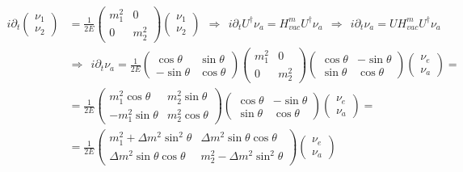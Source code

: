 \documentclass[a4paper,12pt]{article}
\begin{document}
\begin{align*}
i\partial_t\begin{pmatrix}
\nu_1 \\ \nu_2
\end{pmatrix}&=\frac{1}{2E}\begin{pmatrix}
m_1^2&0\\ 0&m_2^2
\end{pmatrix}\begin{pmatrix}
\nu_1\\ \nu_2
\end{pmatrix}\ \ \Rightarrow\ \ i\partial_tU^\dagger\nu_a=H_{vac}^mU^\dagger\nu_a\ \ \Rightarrow\ \ i\partial_t\nu_a=UH_{vac}^mU^\dagger\nu_a\\
&\Rightarrow\ \ i\partial_t\nu_a=\frac{1}{2E}\begin{pmatrix}
\cos\theta&\sin\theta\\ -\sin\theta&\cos\theta
\end{pmatrix}\begin{pmatrix}
m_1^2&0\\ 0&m_2^2
\end{pmatrix}\begin{pmatrix}
\cos\theta&-\sin\theta\\ \sin\theta&\cos\theta
\end{pmatrix}\begin{pmatrix}
\nu_e\\ \nu_a
\end{pmatrix}=\\
&=\frac{1}{2E}\begin{pmatrix}
m_1^2\cos\theta & m_2^2\sin\theta \\ -m_1^2\sin\theta &m_2^2\cos\theta  
\end{pmatrix}\begin{pmatrix}
\cos\theta&-\sin\theta\\ \sin\theta&\cos\theta
\end{pmatrix}\begin{pmatrix}
\nu_e\\ \nu_a
\end{pmatrix}=\\
&=\frac{1}{2E}\begin{pmatrix}
m_1^2+\Delta m^2\sin^2\theta &\Delta m^2\sin\theta\cos\theta\\ \Delta m^2\sin\theta\cos\theta &m_2^2-\Delta m^2\sin^2\theta
\end{pmatrix}\begin{pmatrix}
\nu_e\\ \nu_a
\end{pmatrix}
\end{align*}
\end{document}
